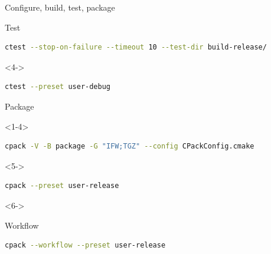 \documentclass{beamer}
\begin{document}
\begin{frame}[fragile]{Configure, build, test, package}
\begin{block}{\footnotesize Test}
\begin{onlyenv}
\begin{lstlisting}[language=sh]
				ctest --stop-on-failure --timeout 10 --test-dir build-release/
			\end{lstlisting}
		\end{onlyenv}
		\begin{onlyenv}<4->
			\begin{lstlisting}[language=sh]
				ctest --preset user-debug
			\end{lstlisting}
		\end{onlyenv}
	\end{block}
	\begin{block}{\footnotesize Package}
		\begin{onlyenv}
			\begin{lstlisting}[language=sh]
				cpack -V -B package -G "IFW;TGZ" --config CPackConfig.cmake
			\end{lstlisting}
		\end{onlyenv}
		\begin{onlyenv}<5->
			\begin{lstlisting}[language=sh]
				cpack --preset user-release
			\end{lstlisting}
		\end{onlyenv}
		\begin{onlyenv}<6->
	\begin{block}{\footnotesize Workflow}
		\begin{lstlisting}[language=sh]
			cpack --workflow --preset user-release
		\end{lstlisting}
	\end{block}
		\end{onlyenv}
	\end{block}
\end{frame}
\end{document}
